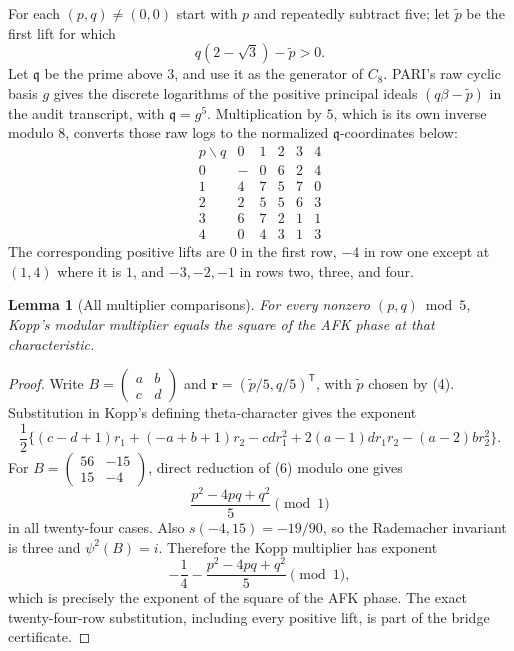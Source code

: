 \documentclass[11pt]{article}
\newtheorem{lemma}[theorem]{Lemma}
\begin{document}
For each $(p,q)\ne(0,0)$ start with $p$ and repeatedly subtract five;
let $\widetilde p$ be the first lift for which
\[
 q(2-\sqrt3)-\widetilde p>0.
\tag{4}
\]
Let $\mathfrak q$ be the prime above $3$, and use it as the generator
of $C_8$.  PARI's raw cyclic basis $g$ gives the discrete logarithms
of the positive principal ideals $(q\beta-\widetilde p)$ in the audit
transcript, with $\mathfrak q=g^5$.  Multiplication by $5$, which is
its own inverse modulo $8$, converts those raw logs to the normalized
$\mathfrak q$-coordinates below:
\[
\begin{array}{c|ccccc}
p\backslash q&0&1&2&3&4\\ \hline
0&-&0&6&2&4\\
1&4&7&5&7&0\\
2&2&5&5&6&3\\
3&6&7&2&1&1\\
4&0&4&3&1&3
\end{array}
\tag{5}
\]
The corresponding positive lifts are
$0$ in the first row, $-4$ in row one except at $(1,4)$ where it is
$1$, and $-3,-2,-1$ in rows two, three, and four.

\begin{lemma}[All multiplier comparisons]\label{lem:multiplier}
For every nonzero $(p,q)\bmod5$, Kopp's modular multiplier equals
the square of the AFK phase at that characteristic.
\end{lemma}

\begin{proof}
Write $B=(\begin{smallmatrix}a&b\\c&d\end{smallmatrix})$ and
$\boldsymbol r=(\widetilde p/5,q/5)^{\mathsf T}$, with
$\widetilde p$ chosen by (4).  Substitution in Kopp's defining
theta-character gives the exponent
\[
\frac12\{(c-d+1)r_1+(-a+b+1)r_2-cd r_1^2
+2(a-1)d r_1r_2-(a-2)b r_2^2\}.
\tag{6}
\]
For $B=(\begin{smallmatrix}56&-15\\15&-4\end{smallmatrix})$, direct
reduction of (6) modulo one gives
\[
 \frac{p^2-4pq+q^2}{5}\pmod1
\tag{7}
\]
in all twenty-four cases.  Also
$s(-4,15)=-19/90$, so the Rademacher invariant is three and
$\psi^2(B)=i$.  Therefore the Kopp multiplier has exponent
\[
 -\frac14-\frac{p^2-4pq+q^2}{5}\pmod1,
\tag{8}
\]
which is precisely the exponent of the square of the AFK phase.
The exact twenty-four-row substitution, including every positive lift,
is part of the bridge certificate.
\end{proof}
\end{document}
